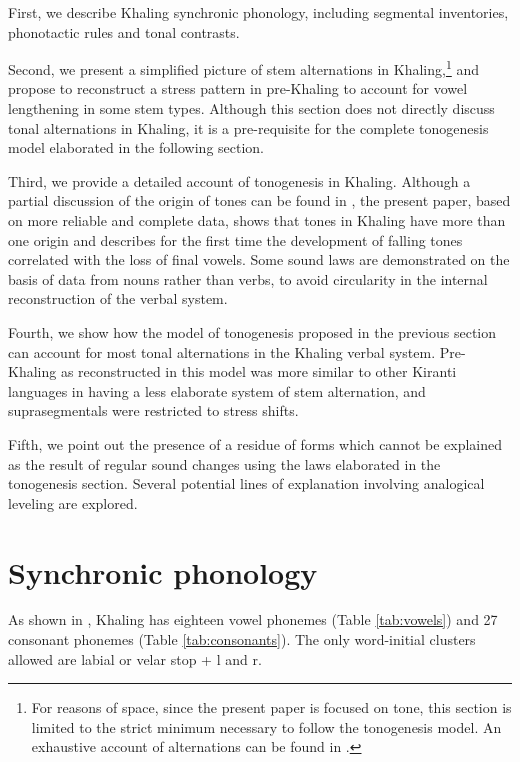 \documentclass[oldfontcommands,oneside,a4paper,11pt]{article}
\newcommand{\ipa}[1]{{\phon \mbox{#1}}} %
\begin{document}
First, we describe  Khaling synchronic phonology, including segmental inventories, phonotactic rules and tonal contrasts. 
 
Second, we present a simplified picture of stem alternations in Khaling,\footnote{For reasons of space, since the present paper is focused on tone, this section is limited to the strict minimum necessary to follow the tonogenesis model. An exhaustive account of alternations can be found in \citet{jacques12khaling}.} and propose to reconstruct a stress pattern in pre-Khaling to account for vowel lengthening in some stem types. Although this section does not directly discuss tonal alternations in Khaling, it is a pre-requisite for the complete tonogenesis model elaborated in the following section.
 
Third, we provide a detailed account of tonogenesis in Khaling. Although a partial discussion of the origin of tones can be found in \citet{michailovsky75khaling}, the present paper, based on more reliable and complete data, shows that tones in Khaling have more than one origin and describes for the first time the development of falling tones correlated with the loss of final vowels. Some sound laws are demonstrated on the basis of data from nouns rather than verbs, to avoid circularity in the internal reconstruction of the verbal system.

Fourth, we show how the model of tonogenesis proposed in the previous section can account for most tonal alternations in the Khaling verbal system. Pre-Khaling as reconstructed in this model was more similar to other Kiranti languages in having a less elaborate system of stem alternation, and suprasegmentals were restricted to stress shifts.

Fifth, we point out the presence of a residue of forms which cannot be explained as the result of regular sound changes using the laws elaborated in the tonogenesis section. Several potential lines of explanation involving analogical leveling are explored.

\section{Synchronic phonology} \label{sec:synchr}

As shown in \citet[1098]{jacques12khaling}, Khaling has eighteen vowel  phonemes (Table \ref{tab:vowels}) and 27 consonant phonemes (Table \ref{tab:consonants}). The only word-initial clusters allowed are labial or velar stop + \ipa{l} and \ipa{r}. 
\end{document}
